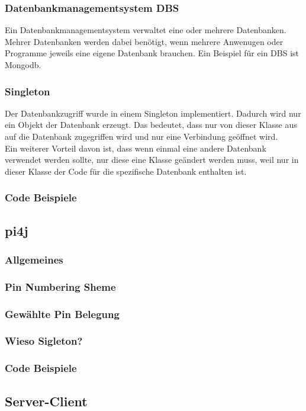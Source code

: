 \subsubsection{Datenbankmanagementsystem DBS}
Ein Datenbankmanagementsystem verwaltet eine oder mehrere Datenbanken. Mehrer Datenbanken werden dabei benötigt, wenn mehrere Anwenugen oder Programme jeweils eine eigene Datenbank brauchen. Ein Beispiel für ein DBS ist Mongodb.

\subsubsection{Singleton}
Der Datenbankzugriff wurde in einem Singleton implementiert. Dadurch wird nur ein Objekt der Datenbank erzeugt. Das bedeutet, dass nur von dieser Klasse aus auf die Datenbank zugegriffen wird und nur eine Verbindung geöffnet wird.
\\ Ein weiterer Vorteil davon ist, dass wenn einmal eine andere Datenbank verwendet werden sollte, nur diese eine Klasse geändert werden muss, weil nur in dieser Klasse der Code für die spezifische Datenbank enthalten ist.

\subsubsection{Code Beispiele}
\subsection{pi4j}
\subsubsection{Allgemeines}
\subsubsection{Pin Numbering Sheme}
\subsubsection{Gewählte Pin Belegung}
\subsubsection{Wieso Sigleton?}
\subsubsection{Code Beispiele}
\subsection{Server-Client}
